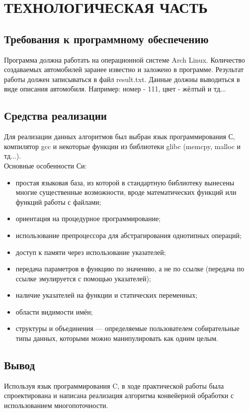 \documentclass[a4paper,12pt]{article}
\begin{document}
\newpage
\section{ТЕХНОЛОГИЧЕСКАЯ ЧАСТЬ}
\subsection{Требования к программному обеспечению}
Программа должна работать на операционной системе Arch Linux. Количество создаваемых автомобилей заранее известно и заложено в программе. Результат работы должен записываться в файл result.txt. Данные должны выводиться в виде описания автомобиля. Например: номер - 111, цвет - жёлтый и тд...

\newpage
\subsection{Средства реализации}
Для реализации данных алгоритмов был выбран язык программирования С, компилятор gcc и некоторые функции из библиотеки glibc (memcpy, malloc и тд...). \\
Основные особенности Си:
\begin{itemize}
\item простая языковая база, из которой в стандартную библиотеку вынесены многие существенные возможности, вроде математических функций или функций работы с файлами;
\item ориентация на процедурное программирование;
\item использование препроцессора для абстрагирования однотипных операций;
\item доступ к памяти через использование указателей;
\item передача параметров в функцию по значению, а не по ссылке (передача по ссылке эмулируется с помощью указателей);
\item наличие указателей на функции и статических переменных;
\item области видимости имён;
\item структуры и объединения — определяемые пользователем собирательные типы данных, которыми можно манипулировать как одним целым.
\end{itemize}

\newpage
\subsection{Вывод}
Используя язык программирования C, в ходе практической работы была спроектирована и написана реализация алгоритма конвейерной обработки с использованием многопоточности.
\end{document}
